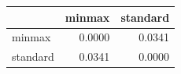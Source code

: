 \begin{tabular}{lrr}
\toprule
 & minmax & standard \\
\midrule
minmax & 0.0000 & 0.0341 \\
standard & 0.0341 & 0.0000 \\
\bottomrule
\end{tabular}

